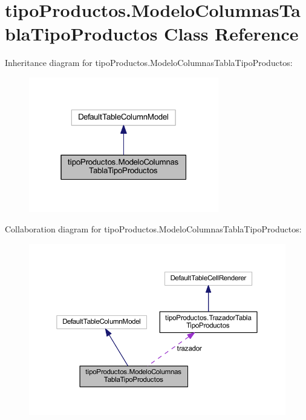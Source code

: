 \hypertarget{classtipo_productos_1_1_modelo_columnas_tabla_tipo_productos}{}\section{tipo\+Productos.\+Modelo\+Columnas\+Tabla\+Tipo\+Productos Class Reference}
\label{classtipo_productos_1_1_modelo_columnas_tabla_tipo_productos}


Inheritance diagram for tipo\+Productos.\+Modelo\+Columnas\+Tabla\+Tipo\+Productos\+:
\nopagebreak
\begin{figure}[H]
\begin{center}
\leavevmode
\includegraphics[width=235pt]{classtipo_productos_1_1_modelo_columnas_tabla_tipo_productos__inherit__graph}
\end{center}
\end{figure}


Collaboration diagram for tipo\+Productos.\+Modelo\+Columnas\+Tabla\+Tipo\+Productos\+:
\nopagebreak
\begin{figure}[H]
\begin{center}
\leavevmode
\includegraphics[width=350pt]{classtipo_productos_1_1_modelo_columnas_tabla_tipo_productos__coll__graph}
\end{center}
\end{figure}
